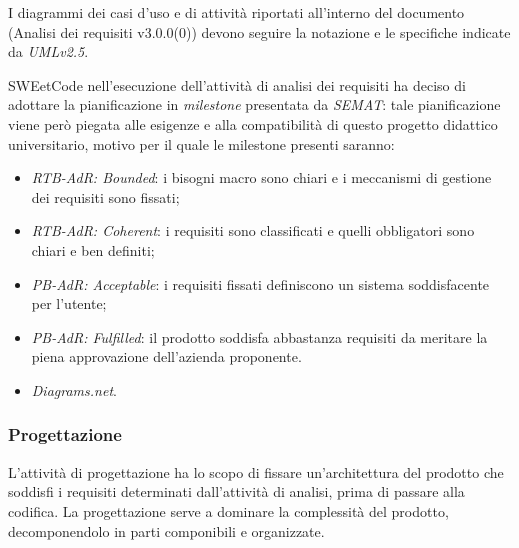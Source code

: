 \documentclass[10pt, a4paper]{article}
\begin{document}
I diagrammi dei casi d'uso e di attività riportati all'interno del documento (Analisi dei requisiti v3.0.0(0)) devono seguire la notazione e le specifiche indicate da \textit{UML\pg v2.5}.

SWEetCode nell'esecuzione dell'attività di analisi dei requisiti ha deciso di adottare la pianificazione in \textit{milestone\pg} presentata 
da \textit{SEMAT}: tale pianificazione viene però piegata alle esigenze e alla compatibilità di questo progetto didattico universitario, motivo per il quale le milestone presenti saranno:
\begin{itemize}
    \item \textit{RTB-AdR: Bounded}: i bisogni macro sono chiari e i meccanismi di gestione dei requisiti sono fissati;
    \item \textit{RTB-AdR: Coherent}: i requisiti sono classificati e quelli obbligatori sono chiari e ben definiti;
    \item \textit{PB-AdR: Acceptable}: i requisiti fissati definiscono un sistema soddisfacente per l'utente;
    \item \textit{PB-AdR: Fulfilled}: il prodotto soddisfa abbastanza requisiti da meritare la piena approvazione dell'azienda proponente. 
\end{itemize}
 
\begin{itemize}
    \item \textit{Diagrams.net}.
\end{itemize}

\subsubsection{Progettazione}
L'attività di progettazione ha lo scopo di fissare un'architettura del prodotto che soddisfi i requisiti determinati dall'attività di analisi, prima di passare alla codifica.
La progettazione serve a dominare la complessità del prodotto, decomponendolo in parti componibili e organizzate.
\end{document}
